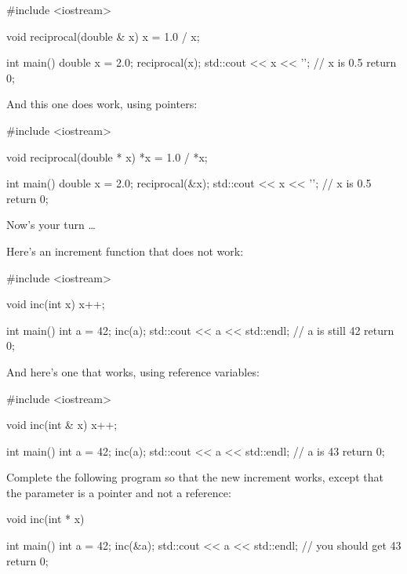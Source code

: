 \begin{consolethree}[escapeinside=||]
#include <iostream>

void reciprocal(double & x)
{
    x = 1.0 / x;
}

int main()
{
    double x = 2.0;
    reciprocal(x);
    std::cout << x << '\n';     // x is 0.5
    return 0;
}
\end{consolethree}
And this one does work, using pointers:

\begin{consolethree}[escapeinside=||]
#include <iostream>

void reciprocal(double * x)
{
    *x = 1.0 / *x;
}

int main()
{
    double x = 2.0;
    reciprocal(&x);
    std::cout << x << '\n';     // x is 0.5
    return 0;
}
\end{consolethree}
Now's your turn \ldots{}

\begin{ex}

Here's an increment function that does not work:

\begin{consolethree}[escapeinside=||]
#include <iostream>

void inc(int x)
{
    x++;
}

int main()
{
    int a = 42;
    inc(a);
    std::cout << a << std::endl;    // a is still 42
    return 0;
}
\end{consolethree}
And here's one that works, using reference variables:

\begin{consolethree}[escapeinside=||]
#include <iostream>

void inc(int & x)
{
    x++;
}

int main()
{
    int a = 42;
    inc(a);
    std::cout << a << std::endl;    // a is 43
    return 0;
}
\end{consolethree}
Complete the following program so that the new increment works, except
that the parameter is a pointer and not a reference:
\end{ex}

\begin{consolethree}[escapeinside=||]
void inc(int * x)
{
}

int main()
{
    int a = 42;
    inc(&a);
    std::cout << a << std::endl;    // you should get 43
    return 0;
}
\end{consolethree}

